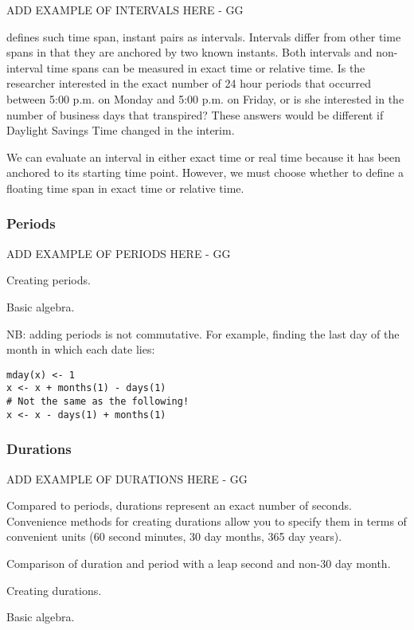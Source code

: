 \documentclass[article]{jss}
\begin{document}
ADD EXAMPLE OF INTERVALS HERE - GG

 defines such time span, instant pairs as intervals. Intervals differ from other time spans in that they are anchored by two known instants. Both intervals and non-interval time spans can be measured in exact time or relative time. Is the researcher interested in the exact number of 24 hour periods that occurred between 5:00 p.m. on Monday and 5:00 p.m. on Friday, or is she interested in the number of business days that transpired? These answers would be different if Daylight Savings Time changed in the interim.

We can evaluate an interval in either exact time or real time because it has been anchored to its starting time point. However, we must choose whether to define a floating time span in exact time or relative time.



\subsubsection{Periods}
\label{sec:periods}

ADD EXAMPLE OF PERIODS HERE - GG

Creating periods.  

Basic algebra.

NB: adding periods is not commutative. For example, finding the last day of the month in which each date lies:

\begin{verbatim}
mday(x) <- 1
x <- x + months(1) - days(1)
# Not the same as the following!
x <- x - days(1) + months(1) 
\end{verbatim}


\subsubsection{Durations}
\label{sec:durations}

ADD EXAMPLE OF DURATIONS HERE - GG

Compared to periods, durations represent an exact number of seconds.  Convenience methods for creating durations allow you to specify them in terms of convenient units (60 second minutes, 30 day months, 365 day years).  

Comparison of duration and period with a leap second and non-30 day month.

Creating durations.

Basic algebra.
\end{document}
